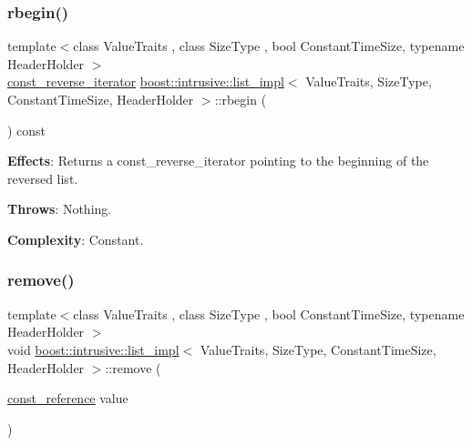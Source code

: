 \subsubsection{\texorpdfstring{rbegin()}{rbegin()}\hspace{0.1cm}{\footnotesize\ttfamily [2/2]}}
{\footnotesize\ttfamily template$<$class Value\+Traits , class Size\+Type , bool Constant\+Time\+Size, typename Header\+Holder $>$ \\
\hyperlink{classboost_1_1intrusive_1_1list__impl_a00a0933ca1d92836a220a604e521d9c4}{const\+\_\+reverse\+\_\+iterator} \hyperlink{classboost_1_1intrusive_1_1list__impl}{boost\+::intrusive\+::list\+\_\+impl}$<$ Value\+Traits, Size\+Type, Constant\+Time\+Size, Header\+Holder $>$\+::rbegin (\begin{DoxyParamCaption}{ }\end{DoxyParamCaption}) const\hspace{0.3cm}{\ttfamily [inline]}}

{\bfseries Effects}\+: Returns a const\+\_\+reverse\+\_\+iterator pointing to the beginning of the reversed list.

{\bfseries Throws}\+: Nothing.

{\bfseries Complexity}\+: Constant. \mbox{\label{classboost_1_1intrusive_1_1list__impl_a67b3e202dc68b3de5643c2abf40847f7}} 
\subsubsection{\texorpdfstring{remove()}{remove()}}
{\footnotesize\ttfamily template$<$class Value\+Traits , class Size\+Type , bool Constant\+Time\+Size, typename Header\+Holder $>$ \\
void \hyperlink{classboost_1_1intrusive_1_1list__impl}{boost\+::intrusive\+::list\+\_\+impl}$<$ Value\+Traits, Size\+Type, Constant\+Time\+Size, Header\+Holder $>$\+::remove (\begin{DoxyParamCaption}\item[{\hyperlink{classboost_1_1intrusive_1_1list__impl_a3d37629151c76fb8389ac3ba3b359201}{const\+\_\+reference}}]{value }\end{DoxyParamCaption})\hspace{0.3cm}{\ttfamily [inline]}}

